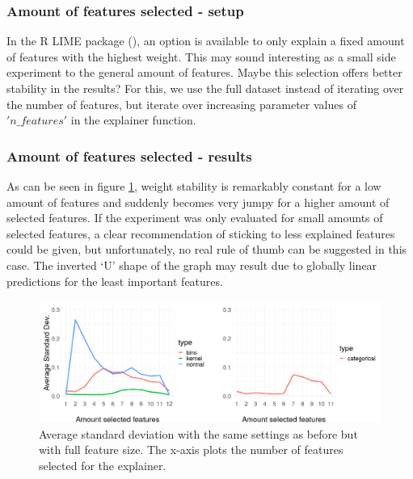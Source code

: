 \documentclass[
]{krantz}
\begin{document}
\hypertarget{amount-of-features-selected---setup}{%
\subsubsection{Amount of features selected - setup}\label{amount-of-features-selected---setup}}

In the R LIME package (\citet{thomasp85lime}), an option is available to only explain a fixed amount of features with the highest weight.
This may sound interesting as a small side experiment to the general amount of features.
Maybe this selection offers better stability in the results?
For this, we use the full dataset instead of iterating over the number of features, but iterate over increasing parameter values of \('n\_features'\) in the explainer function.

\hypertarget{amount-of-features-selected---results}{%
\subsubsection{Amount of features selected - results}\label{amount-of-features-selected---results}}

As can be seen in figure \ref{fig:figsdnfeat}, weight stability is remarkably constant for a low amount of features and suddenly becomes very jumpy for a higher amount of selected features.
If the experiment was only evaluated for small amounts of selected features, a clear recommendation of sticking to less explained features could be given, but unfortunately, no real rule of thumb can be suggested in this case.
The inverted `U' shape of the graph may result due to globally linear predictions for the least important features.

\begin{figure}

{\centering \includegraphics[width=19.44in]{images/sd_nfeat_presi3} 

}

\caption{Average standard deviation with the same settings as before but with full feature size. The x-axis plots the number of features selected for the explainer.}\label{fig:figsdnfeat}
\end{figure}
\end{document}
